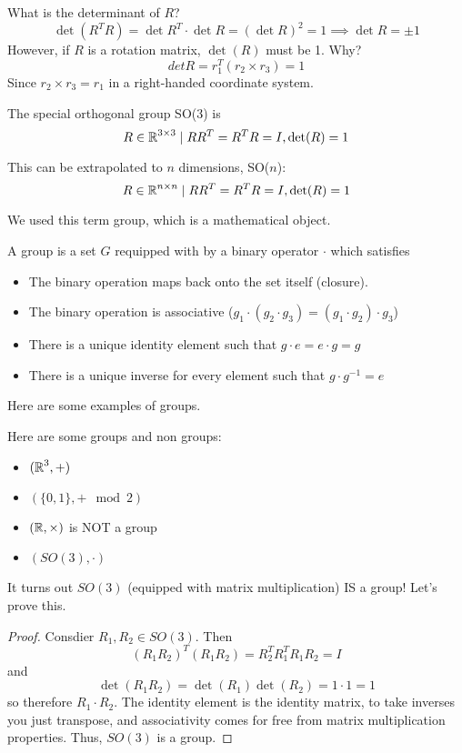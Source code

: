 What is the determinant of $R$?
\[ \det(R^T R) = \det R^T \cdot \det R = (\det R)^2 = 1 \implies \det R = \pm 1 \]
However, if $R$ is a rotation matrix, $\det(R)$ must be 1. Why?
\[ det R = r_1^T(r_2 \times r_3) = 1 \]
Since $r_2 \times r_3 = r_1$ in a right-handed coordinate system.

\begin{definition}[SO($n$)]
    The special orthogonal group SO(3) is
    \[ R \in \operatorname{\mathbb{R}}^{3 \times 3} \mid RR^T = R^TR = I, \det(R) = 1 \]

    This can be extrapolated to $n$ dimensions, SO($n$):
    \[ R \in \operatorname{\mathbb{R}}^{n \times n} \mid RR^T = R^TR = I, \det(R) = 1 \]
\end{definition}

We used this term group, which is a mathematical object.

\begin{definition}[Groups]
    A group is a set $G$ requipped with by a binary operator $\cdot$ which satisfies
    \begin{itemize}
        \item The binary operation maps back onto the set itself (closure).
        \item The binary operation is associative ($g_1 \cdot (g_2 \cdot g_3) = (g_1 \cdot g_2) \cdot g_3$)
        \item There is a unique identity element such that $g \cdot e = e \cdot g = g$
        \item There is a unique inverse for every element such that $g \cdot g^{-1} = e$
    \end{itemize}
\end{definition}

Here are some examples of groups.
\begin{example}
    Here are some groups and non groups:
    \begin{itemize}
        \item $(\operatorname{\mathbb{R}}^3, +)$
        \item $(\{0, 1\}, + \mod 2)$
        \item $(\operatorname{\mathbb{R}}, \times)$ is NOT a group
        \item $(SO(3), \cdot)$
    \end{itemize}
\end{example}

It turns out $SO(3)$ (equipped with matrix multiplication) IS a group! Let's prove this.
\begin{proof}
    Consdier $R_1, R_2 \in SO(3)$. Then 
    \[ (R_1 R_2)^T (R_1 R_2) = R_2^T R_1^T R_1 R_2 = I\]
    and
    \[ \det(R_1 R_2) = \det(R_1) \det(R_2) = 1 \cdot 1 = 1 \]
    so therefore $R_1 \cdot R_2$. The identity element is the identity matrix,
    to take inverses you just transpose, and associativity comes for free from matrix multiplication properties.
    Thus, $SO(3)$ is a group.
\end{proof}

